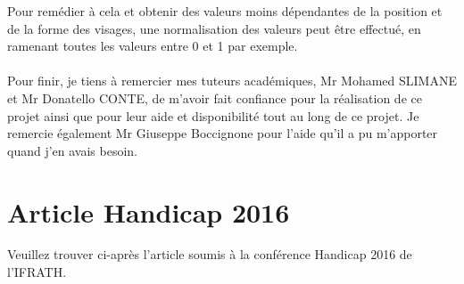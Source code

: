 \documentclass[poster]{polytech/polytech}
\begin{document}
Pour remédier à cela et obtenir des valeurs moins dépendantes de la position et de la forme des visages, une normalisation des valeurs peut être effectué, en ramenant toutes les valeurs entre 0 et 1 par exemple.\\
\\
Pour finir, je tiens à remercier mes tuteurs académiques, Mr Mohamed SLIMANE et Mr Donatello CONTE, de m'avoir fait confiance pour la réalisation de ce projet ainsi que pour leur aide et disponibilité tout au long de ce projet. Je remercie également Mr Giuseppe Boccignone pour l'aide qu'il a pu m'apporter quand j'en avais besoin.


\appendix

\chapter{Article Handicap 2016}
\label{annexArticle}
Veuillez trouver ci-après l'article soumis à la conférence Handicap 2016 de l'IFRATH.

\end{document}
